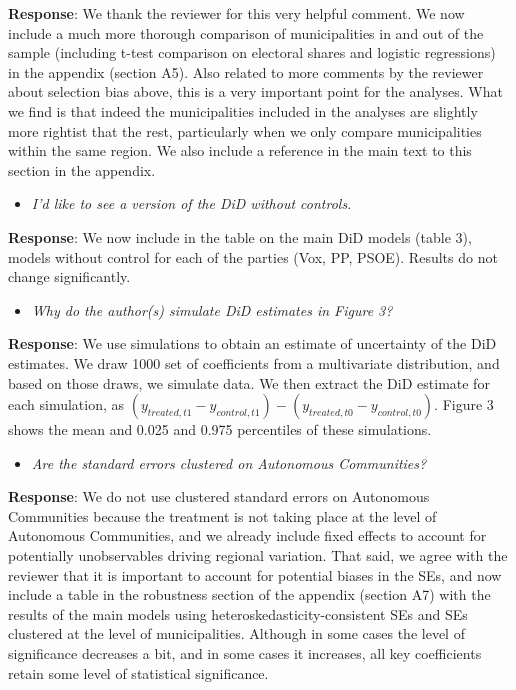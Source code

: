 \documentclass[12pt, a4paper, notitlepage]{article}
\begin{document}
\textbf{Response}: We thank the reviewer for this very helpful comment. We now include a much more thorough comparison of municipalities in and out of the sample (including t-test comparison on electoral shares and logistic regressions) in the appendix (section A5). Also related to more comments by the reviewer about selection bias above, this is a very important point for the analyses. What we find is that indeed the municipalities included in the analyses are slightly more rightist that the rest, particularly when we only compare municipalities within the same region.
We also include a reference in the main text to this section in the appendix.

\begin{itemize}
  \item \textit{I’d like to see a version of the DiD without controls.}
\end{itemize}

\textbf{Response}: We now include in the table on the main DiD models (table 3), models without control for each of the parties (Vox, PP, PSOE). Results do not change significantly.

\begin{itemize}
  \item \textit{Why do the author(s) simulate DiD estimates in Figure 3?}
\end{itemize}

\textbf{Response}: We use simulations to obtain an estimate of uncertainty of the DiD estimates. We draw 1000 set of coefficients from a multivariate distribution, and based on those draws, we simulate data. We then extract the DiD estimate for each simulation, as $(y_{treated, t1} - y_{control, t1})-(y_{treated, t0} - y_{control, t0})$.
Figure 3 shows the mean and 0.025 and 0.975 percentiles of these simulations.

\begin{itemize}
  \item \textit{Are the standard errors clustered on Autonomous Communities?}
\end{itemize}

\textbf{Response}: We do not use clustered standard errors on Autonomous Communities because the treatment is not taking place at the level of Autonomous Communities, and we already include fixed effects to account for potentially unobservables driving regional variation. That said, we agree with the reviewer that it is important to account for potential biases in the SEs, and now include a table in the robustness section of the appendix (section A7) with the results of the main models using heteroskedasticity-consistent SEs and SEs clustered at the level of municipalities.
Although in some cases the level of significance decreases a bit, and in some cases it increases, all key coefficients retain some level of statistical significance.
\end{document}
